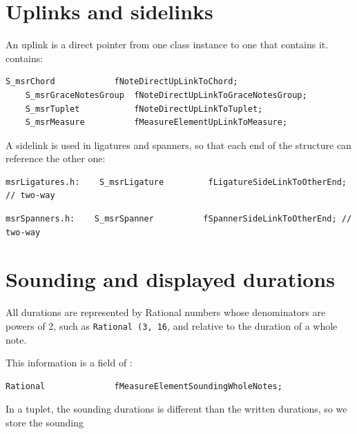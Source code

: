 \section{Uplinks and sidelinks}\label{Uplinks and sidelinks}

An uplink is a direct pointer from one class   instance to one that contains it.  contains:
\begin{lstlisting}[language=CPlusPlus]
    S_msrChord            fNoteDirectUpLinkToChord;
    S_msrGraceNotesGroup  fNoteDirectUpLinkToGraceNotesGroup;
    S_msrTuplet           fNoteDirectUpLinkToTuplet;
    S_msrMeasure          fMeasureElementUpLinkToMeasure;
\end{lstlisting}

A sidelink is used in ligatures and spanners, so that each end of the structure can reference the other one:
\begin{lstlisting}[language=CPlusPlus]
msrLigatures.h:    S_msrLigature         fLigatureSideLinkToOtherEnd; // two-way
\end{lstlisting}

\begin{lstlisting}[language=CPlusPlus]
msrSpanners.h:    S_msrSpanner          fSpannerSideLinkToOtherEnd; // two-way
\end{lstlisting}


\section{Sounding and displayed durations}\label{Sounding and displayed durations}

All durations are represented by Rational numbers whose denominators are powers of 2, such as {\tt Rational (3, 16}, and relative to the duration of a whole note.

This information is a field of :
\begin{lstlisting}[language=CPlusPlus]
    Rational              fMeasureElementSoundingWholeNotes;
\end{lstlisting}

In a tuplet, the sounding durations is different than the written durations, so we store the sounding

